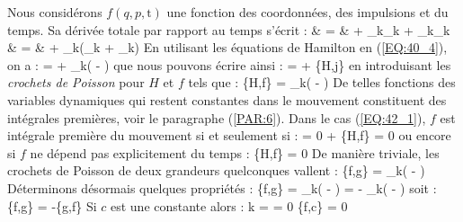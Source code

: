 Nous consid\'{e}rons $f(q,p,\mathrm{t})$ une fonction des coordonn\'{e}es, des impulsions et du temps. Sa d\'{e}riv\'{e}e totale par rapport au temps s'\'{e}crit :
\bea
	 & = &  + \sum_{k}_{k} + \sum_{k}_{k} \nonumber \\
	& = &  + \sum_{k}\left(_{k} + _{k}\right) \nonumber
\eea
En utilisant les \'{e}quations de Hamilton en (\ref{EQ:40_4}), on a :
\benn
	 =  + \sum_{k}\left( - \right)
\eenn
que nous pouvons \'{e}crire ainsi :
\be
	 =  + \{H,j\} \label{EQ:42_1}
\ee
en introduisant les \emph{crochets de Poisson} pour $H$ et $f$ tels que :
\be
	\{H,f\} = \sum_{k}\left( - \right) \label{EQ:42_2}
\ee
De telles fonctions des variables dynamiques qui restent constantes dans le mouvement constituent des intégrales premi\`{e}res, voir le paragraphe (\ref{PAR:6}). Dans le cas (\ref{EQ:42_1}), $f$ est int\'{e}grale premi\`{e}re du mouvement si et seulement si :
\be
	 = 0 \Leftrightarrow {} + \{H,f\} = 0 \label{EQ:42_3}
\ee
ou encore si $f$ ne d\'{e}pend pas explicitement du temps :
\be
	\{H,f\} = 0 \label{EQ:42_4}
\ee
De mani\`{e}re triviale, les crochets de Poisson de deux grandeurs quelconques vallent :
\be
	\{f,g\} = \sum_{k}\left( - \right) \label{EQ:42_5}
\ee
D\'{e}terminons d\'{e}sormais quelques propri\'{e}t\'{e}s :
\benn
        \{f,g\} = \sum_{k}\left( - \right) = - \sum_{k}\left( - \right)
\eenn
soit :
\be
	\{f,g\} = -\{g,f\} \label{EQ:42_6}
\ee
Si $c$ est une constante alors :
\be
	\forall k\text{, }  =  = 0 \Rightarrow \{f,c\} = 0 \label{EQ:42_7}
